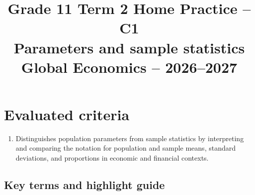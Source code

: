 \makeatletter
{}
\makeatother




\CoordinatedTermTwoPalette
\usepackage{needspace}
\usepackage{titling}
\setlength{\droptitle}{-2em}
\pretitle{\par\begingroup\centering\LARGE}
\posttitle{\par\endgroup}
\preauthor{}\postauthor{}
\predate{}\postdate{}
\maketitlehookd{\vspace{-1em}}
\linespread{1.12}
\setlength{\parskip}{5pt}

\title{Grade 11 Term 2 Home Practice -- C1\\\large Parameters and sample statistics\\[0.25em]
	\normalsize Global Economics -- 2026--2027}
\author{}
\date{}


	\maketitle
	\vspace{-1.5\baselineskip}

	\setcounter{tocdepth}{1}
	\setcounter{secnumdepth}{2}
	\setlength{\cftbeforesecskip}{3pt}
	\label{toc}
	\tableofcontents

	\section*{Evaluated criteria}
	\begin{enumerate}[label=\textbf{C\arabic*},start=1]
		\item Distinguishes population parameters from sample statistics by interpreting and comparing the notation for population and sample means, standard deviations, and proportions in economic and financial contexts.
	\end{enumerate}

    \subsection*{Key terms and highlight guide}
    \label{subsec:c1-key-terms}
    \label{tab:highlight-legend}

